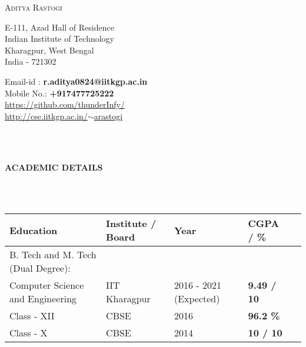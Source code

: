 \documentclass[letter,10pt]{book}
\newcommand{\lsep}{-0.5cm}
\newcommand{\resheading}[1]{{\small \colorbox{mygrey}{\begin{minipage}{0.975\textwidth}{\textbf{#1 \vphantom{p\^{E}}}}\end{minipage}}}}
\begin{document}
\begin{center}
\textsc{\Huge Aditya Rastogi}
\end{center}

\begin{minipage}{0.30\textwidth}
{\raggedleft
E-111, Azad Hall of Residence\\
Indian Institute of Technology\\
Kharagpur, West Bengal\\
India - 721302\\
}
\end{minipage}%
\begin{minipage}{0.33\textwidth}
\begin{center}
\end{center}
\end{minipage}%
\begin{minipage}{0.33\textwidth}
{\raggedright
Email-id : \textbf{r.aditya0824@iitkgp.ac.in} \\
Mobile No.: \textbf{+917477725222} \\
\href{https://github.com/thunderInfy/}{https://github.com/thunderInfy/} \\
\href{http://cse.iitkgp.ac.in/~arastogi}{http://cse.iitkgp.ac.in/$\sim$arastogi}\\
}
\end{minipage}%
\hspace{0.5cm}\\
\\
\resheading{\textbf{ACADEMIC DETAILS} }\\[\lsep]
\\
\begin{center}
\renewcommand{\arraystretch}{1.5}
\indent \begin{tabular}{ |@{\hskip 0.125in}l @{\hskip 0.125in} |@{\hskip 0.125in}l @{\hskip 0.125in} |@{\hskip 0.125in}l @{\hskip 0.125in} |@{\hskip 0.125in}l @{\hskip 0.25in} |l }
\hline
\textbf{Education} & \textbf{Institute / Board} & \textbf{Year} & \textbf{CGPA / \%} \\
\hline
B. Tech and M. Tech (Dual Degree): &&&\\[-0.5em]
{Computer Science and Engineering} & IIT Kharagpur  & 2016 - 2021 (Expected) & \textbf{9.49 / 10} \\
\hline
Class - XII & CBSE & 2016 & \textbf{96.2 \%}\\
\hline
Class - X & CBSE & 2014 & \textbf{10 / 10}\\
\hline
\end{tabular}
\end{center}
\end{document}
